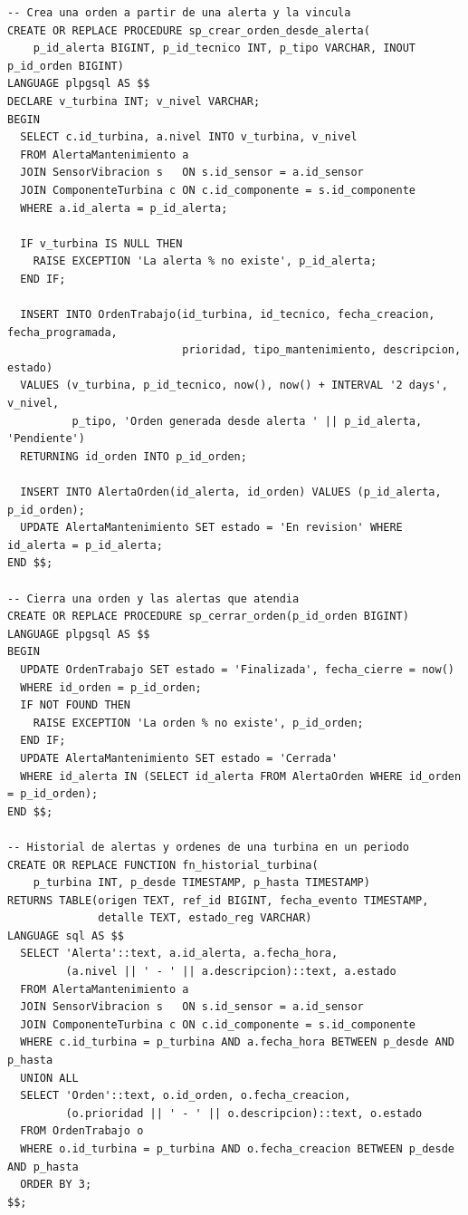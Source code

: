 \documentclass[11pt,a4paper]{article}
\begin{document}
\begin{lstlisting}
-- Crea una orden a partir de una alerta y la vincula
CREATE OR REPLACE PROCEDURE sp_crear_orden_desde_alerta(
    p_id_alerta BIGINT, p_id_tecnico INT, p_tipo VARCHAR, INOUT p_id_orden BIGINT)
LANGUAGE plpgsql AS $$
DECLARE v_turbina INT; v_nivel VARCHAR;
BEGIN
  SELECT c.id_turbina, a.nivel INTO v_turbina, v_nivel
  FROM AlertaMantenimiento a
  JOIN SensorVibracion s   ON s.id_sensor = a.id_sensor
  JOIN ComponenteTurbina c ON c.id_componente = s.id_componente
  WHERE a.id_alerta = p_id_alerta;

  IF v_turbina IS NULL THEN
    RAISE EXCEPTION 'La alerta % no existe', p_id_alerta;
  END IF;

  INSERT INTO OrdenTrabajo(id_turbina, id_tecnico, fecha_creacion, fecha_programada,
                           prioridad, tipo_mantenimiento, descripcion, estado)
  VALUES (v_turbina, p_id_tecnico, now(), now() + INTERVAL '2 days', v_nivel,
          p_tipo, 'Orden generada desde alerta ' || p_id_alerta, 'Pendiente')
  RETURNING id_orden INTO p_id_orden;

  INSERT INTO AlertaOrden(id_alerta, id_orden) VALUES (p_id_alerta, p_id_orden);
  UPDATE AlertaMantenimiento SET estado = 'En revision' WHERE id_alerta = p_id_alerta;
END $$;

-- Cierra una orden y las alertas que atendia
CREATE OR REPLACE PROCEDURE sp_cerrar_orden(p_id_orden BIGINT)
LANGUAGE plpgsql AS $$
BEGIN
  UPDATE OrdenTrabajo SET estado = 'Finalizada', fecha_cierre = now()
  WHERE id_orden = p_id_orden;
  IF NOT FOUND THEN
    RAISE EXCEPTION 'La orden % no existe', p_id_orden;
  END IF;
  UPDATE AlertaMantenimiento SET estado = 'Cerrada'
  WHERE id_alerta IN (SELECT id_alerta FROM AlertaOrden WHERE id_orden = p_id_orden);
END $$;

-- Historial de alertas y ordenes de una turbina en un periodo
CREATE OR REPLACE FUNCTION fn_historial_turbina(
    p_turbina INT, p_desde TIMESTAMP, p_hasta TIMESTAMP)
RETURNS TABLE(origen TEXT, ref_id BIGINT, fecha_evento TIMESTAMP,
              detalle TEXT, estado_reg VARCHAR)
LANGUAGE sql AS $$
  SELECT 'Alerta'::text, a.id_alerta, a.fecha_hora,
         (a.nivel || ' - ' || a.descripcion)::text, a.estado
  FROM AlertaMantenimiento a
  JOIN SensorVibracion s   ON s.id_sensor = a.id_sensor
  JOIN ComponenteTurbina c ON c.id_componente = s.id_componente
  WHERE c.id_turbina = p_turbina AND a.fecha_hora BETWEEN p_desde AND p_hasta
  UNION ALL
  SELECT 'Orden'::text, o.id_orden, o.fecha_creacion,
         (o.prioridad || ' - ' || o.descripcion)::text, o.estado
  FROM OrdenTrabajo o
  WHERE o.id_turbina = p_turbina AND o.fecha_creacion BETWEEN p_desde AND p_hasta
  ORDER BY 3;
$$;
\end{lstlisting}
\end{document}
